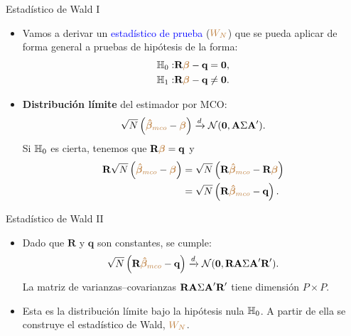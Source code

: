 \documentclass[10pt, xcolor=dvipsnames]{beamer}
\begin{document}
\begin{frame}{Estadístico de Wald I}
\begin{itemize}
    \item Vamos a derivar un \textcolor{blue}{estadístico de prueba} ($\textcolor{brown}{W_N}$) que se pueda aplicar de forma general a pruebas de hipótesis de la forma: 
    \begin{align*}
    \begin{split}
        \textcolor{black}{\mathbb{H}_{0}}:& \textbf{R}\textcolor{brown}{\boldsymbol{\beta}} - \textbf{q} = \mathbf{0}, \\
        \textcolor{black}{\mathbb{H}_{1}}:& \textbf{R}\textcolor{brown}{\boldsymbol{\beta}} - \textbf{q} \neq \mathbf{0}.
    \end{split}
    \end{align*}
   \pause
    \item \textbf{Distribución límite} del estimador por MCO:
    \begin{align*}
    \begin{split}
        \sqrt{N}\left(\textcolor{brown}{\boldsymbol{\hat{\beta}}_{mco}} - \textcolor{brown}{\boldsymbol{\beta}}\right) \xrightarrow{d} \mathcal{N}(\mathbf{0}, \textbf{A} \Sigma \textbf{A}'). 
    \end{split}
    \end{align*}	 
   \pause
    Si $\textcolor{black}{\mathbb{H}_{0}}$ es cierta, tenemos que $\textbf{R}\textcolor{brown}{\boldsymbol{\beta}}=\textbf{q}$ y 
    \begin{align*}
    \begin{split}
        \textbf{R}\sqrt{N}\left(\textcolor{brown}{\boldsymbol{\hat{\beta}}_{mco}}-\textcolor{brown}{\boldsymbol{\beta}}\right) &= \sqrt{N}\left(\textbf{R}\textcolor{brown}{\boldsymbol{\hat{\beta}}_{mco}}-\textbf{R}\textcolor{brown}{\boldsymbol{\beta}}\right) \\ &= \sqrt{N}\left(\textbf{R}\textcolor{brown}{\boldsymbol{\hat{\beta}}_{mco}}-\textbf{q}\right).
    \end{split}
    \end{align*}	 
\end{itemize}
\end{frame}


\begin{frame}{Estadístico de Wald II}
\begin{itemize}
    \item Dado que $\textbf{R}$ y $\textbf{q}$ son constantes, se cumple:
    \begin{align*}
    \begin{split}
        \sqrt{N}\left(\textbf{R}\textcolor{brown}{\boldsymbol{\hat{\beta}}_{mco}}-\textbf{q}\right) \xrightarrow{d} \mathcal{N}(\mathbf{0}, \textbf{R}\textbf{A} \Sigma \textbf{A}'\textbf{R}'). 
    \end{split}
    \end{align*}
    La matriz de varianzas--covarianzas \(\textbf{R}\textbf{A} \Sigma \textbf{A}'\textbf{R}'\) tiene dimensión \(P \times P\). 
    \pause
    \item Esta es la distribución límite bajo la hipótesis nula \(\mathbb{H}_{0}\). A partir de ella se construye el estadístico de Wald, \(\textcolor{brown}{W_N}\).
\end{itemize}
\end{frame}
\end{document}
